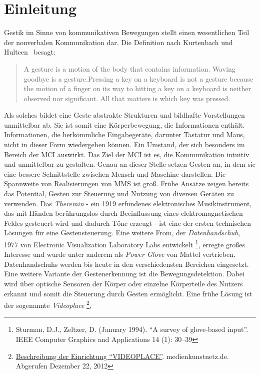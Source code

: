 \chapter{Einleitung}
\label{chap:Einleitung}
Gestik im Sinne von kommunikativen Bewegungen stellt einen wesentlichen Teil der nonverbalen Kommunikation dar. Die Definition nach Kurtenbach und Hulteen~\cite{bib:kurtenbach} besagt:
\begin{quote}
A gesture is a motion of the body that contains information. Waving goodbye is a gesture.Pressing a key on a keyboard is not a gesture because the motion of a finger on its way to hitting a key on a keyboard is neither observed nor significant. All that matters is which key was pressed.
\end{quote}
Als solches bildet eine Geste abstrakte Strukturen und bildhafte Vorstellungen unmittelbar ab. Sie ist somit eine K\"orperbewegung, 
die Informationen enth\"alt. Informationen, die herk\"ommliche Eingabeger\"ate, darunter Tastatur und Maus, nicht in dieser Form wiedergeben k\"onnen.
Ein Umstand, der sich besonders im Bereich der \gls{MCI} auswirkt.
\newline
Das Ziel der \gls{MCI} ist es, die Kommunikation intuitiv und unmittelbar zu gestalten.
Genau an dieser Stelle setzen Gesten an, in dem sie eine bessere Schnittstelle zwischen Mensch und Maschine darstellen.
\newline
Die Spannweite von Realisierungen von \gls{MMS} ist gro\ss .
Fr\"uhe Ans\"atze zeigen bereits das Potential, Gesten zur Steuerung und Nutzung von diversen Ger\"aten zu verwenden.
Das \textit{Theremin} - 
ein 1919 erfundenes elektronisches Musikinstrument, das mit H\"anden ber\"uhrungslos durch Beeinflussung eines elektromagnetischen Feldes 
gesteuert wird und dadurch T\"one erzeugt - ist eine der ersten technischen L\"osungen f\"ur eine Gestensteuerung.
Eine weitere From, der \textit{\gls{Datenhandschuh}}, 1977 von Electronic Visualization Laboratory Labs entwickelt
\footnote{Sturman, D.J., Zeltzer, D. (January 1994). \enquote{A survey of glove-based input}. IEEE Computer Graphics and Applications 14 (1): 30–39}, 
erregte gro\ss es Interesse und wurde unter anderem als \textit{Power Glove} von Mattel vertrieben.
\glspl{Datenhandschuh} werden bis heute in den verschiedensten Bereichen eingesetzt.
\newline
Eine weitere Variante der Gestenerkennung ist die \gls{Bewegungsdetektion}. Dabei wird \"uber optische Sensoren der K\"orper oder einzelne K\"orperteile
des Nutzers erkannt und somit die Steuerung durch Gesten erm\"oglicht. Eine fr\"uhe L\"osung ist der sogenannte \textit{Videoplace} \footnote{\href{http://www.medienkunstnetz.de/works/videoplace/}{Beschreibung der Einrichtung \enquote{VIDEOPLACE}}. medienkunstnetz.de. Abgerufen Dezember 22, 2012},
